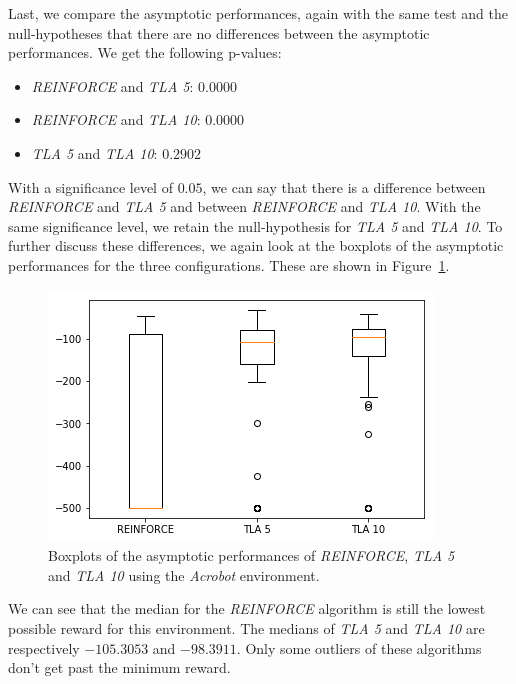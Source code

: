 Last, we compare the asymptotic performances, again with the same test and the null-hypotheses that there are no differences between the asymptotic performances.
We get the following p-values:
\begin{itemize}
    \item \textit{REINFORCE} and \textit{TLA 5}: $0.0000$
    \item \textit{REINFORCE} and \textit{TLA 10}: $0.0000$
    \item \textit{TLA 5} and \textit{TLA 10}: $0.2902$
\end{itemize}
With a significance level of $0.05$, we can say that there is a difference between \textit{REINFORCE} and \textit{TLA 5} and between \textit{REINFORCE} and \textit{TLA 10}. With the same significance level, we retain the null-hypothesis for \textit{TLA 5} and \textit{TLA 10}. To further discuss these differences, we again look at the boxplots of the asymptotic performances for the three configurations. These are shown in Figure~\ref{fig:Acrobot:asymp_target_re-akt5-akt10}.
\begin{figure}[htb]
    \centering
    \includegraphics[width=.8\linewidth]{images/results/Acrobot/no_sparse_transfer/asymp_target_re-akt5-akt10.png}
    \caption{Boxplots of the asymptotic performances of \textit{REINFORCE}, \textit{TLA 5} and \textit{TLA 10} using the \textit{Acrobot} environment.}
    \label{fig:Acrobot:asymp_target_re-akt5-akt10}
\end{figure}
We can see that the median for the \textit{REINFORCE} algorithm is still the lowest possible reward for this environment. The medians of \textit{TLA 5} and \textit{TLA 10} are respectively $-105.3053$ and $-98.3911$. Only some outliers of these algorithms don't get past the minimum reward.

